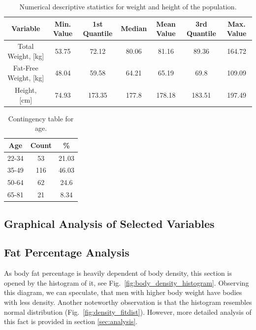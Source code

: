 \documentclass[11pt,american,american]{article}
\begin{document}
\medskip

\begin{table}[ht!]
	\centering
	\begin{tabular}{|c||c|c|c|c|c|c|}
		\hline 
		Variable &  Min. Value &  1st Quantile &  Median &  Mean Value &  3rd Quantile & Max. Value   \\ 
		\hline \hline 
		Total Weight, [kg] & 53.75 & 72.12 & 80.06 & 81.16 & 89.36 & 164.72   \\ 
		\hline 
		Fat-Free Weight, [kg] & 48.04 & 59.58 & 64.21 & 65.19 & 69.8 & 109.09   \\ 
		\hline 
		Height, [cm] & 74.93 & 173.35 & 177.8 & 178.18 & 183.51 & 197.49   \\ 
		\hline 
	\end{tabular} 
	\caption{Numerical descriptive statistics for weight and height of the population.}	
	\label{tab:desc1}
\end{table}

\begin{table}[ht!]
	\centering
	\begin{tabular}{|c||c|c|}
		\hline 
		Age & Count &  \%   \\ 
		\hline \hline 
		22-34 & 53 & 21.03   \\
		\hline
		35-49 & 116 & 46.03  \\
		\hline  
		50-64 & 62 &  24.6  \\
		\hline 
		65-81 & 21 &  8.34  \\
		\hline 
	
	\end{tabular} 
	\caption{Contingency table for age.}
	\label{tab:desc2}	
\end{table}
 
\subsection{Graphical Analysis of Selected Variables}

\subsection{Fat Percentage Analysis}

As body fat percentage is heavily dependent of body density, this section is opened by the histogram of it, see Fig.~\ref{fig:body_density_histogram}. Observing this diagram, we can speculate, that men with higher body weight have bodies with less density. Another noteworthy observation is that the histogram resembles normal distribution (Fig.~\ref{fig:density_fitdist}). However, more detailed analysis of this fact is provided in section \ref{sec:analysis}.
\end{document}
